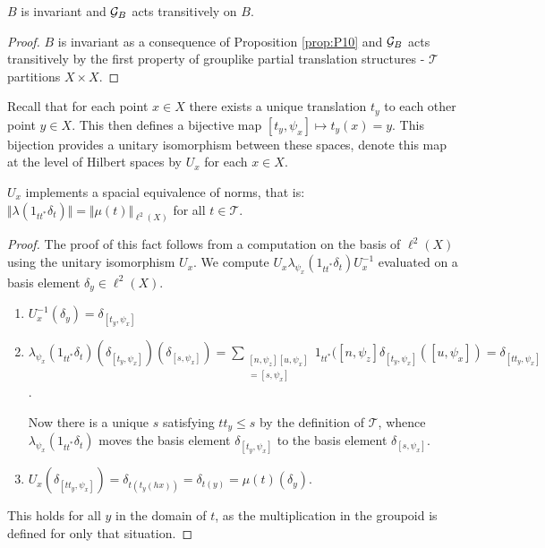 \begin{corollary}
\begin{proposition}\label{cor:C4}
$B$ is invariant and $\mathcal{G}_{B}$ acts transitively on $B$. 
\end{proposition}
\begin{proof}
$B$ is invariant as a consequence of Proposition \ref{prop:P10} and $\mathcal{G}_{B}$ acts transitively by the first property of grouplike partial translation structures - $\mathcal{T}$ partitions $X \times X$. 
\end{proof}

Recall that for each point $x \in X$ there exists a unique translation $t_{y}$ to each other point $y \in X$. This then defines a bijective map $[t_{y}, \psi_{x}] \mapsto t_{y}(x)=y$. This bijection provides a unitary isomorphism between these spaces, denote this map at the level of Hilbert spaces by $U_{x}$ for each $x \in X$.

\begin{proposition}\label{prop:P11}
$U_{x}$ implements a spacial equivalence of norms, that is: $\Vert \lambda(1_{tt^{*}}\delta_{t}) \Vert = \Vert \mu(t) \Vert_{\ell^{2}(X)}$ for all $t \in \mathcal{T}$.
\end{proposition}
\begin{proof}
The proof of this fact follows from a computation on the basis of $\ell^{2}(X)$ using the unitary isomorphism $U_{x}$. We compute $U_{x}\lambda_{\psi_{x}}(1_{tt^{*}}\delta_{t})U_{x}^{-1}$ evaluated on a basis element $\delta_{y} \in \ell^{2}(X)$.
\begin{enumerate}
\item $U_{x}^{-1}(\delta_{y})=\delta_{[t_{y},\psi_{x}]}$
\item $\lambda_{\psi_{x}}(1_{tt^{*}}\delta_{t})(\delta_{[t_{y},\psi_{x}]})(\delta_{[s,\psi_{x}]})=\sum_{\substack{[n,\psi_{z}][u,\psi_{x}]\\=[s,\psi_{x}]}} 1_{tt^{*}}([n, \psi_{z}]\delta_{[t_{y},\psi_{x}]}([u,\psi_{x}])=\delta_{[tt_{y},\psi_{x}]}$.

Now there is a unique $s$ satisfying $tt_{y}\leq s$ by the definition of $\mathcal{T}$, whence $\lambda_{\psi_{x}}(1_{tt^{*}}\delta_{t})$ moves the basis element $\delta_{[t_{y},\psi_{x}]}$ to the basis element $\delta_{[s,\psi_{x}]}$.
\item $U_{x}(\delta_{[tt_{y},\psi_{x}]})=\delta_{t(t_{y}(hx))}=\delta_{t(y)}=\mu(t)(\delta_{y})$.
\end{enumerate}
This holds for all $y$ in the domain of $t$, as the multiplication in the groupoid is defined for only that situation.


\end{proof}
\end{corollary}
